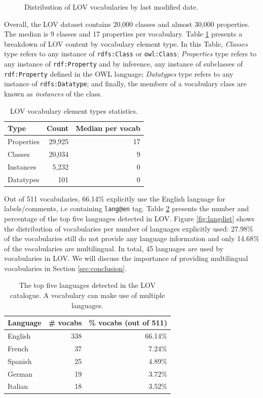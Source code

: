 \documentclass{iosart2c}
\begin{document}
\begin{figure}[htb]
\resizebox{\linewidth}{!}{}
\caption{\label{fig:modifevol} Distribution of LOV vocabularies by last modified date.}
\end{figure}

 
Overall, the LOV dataset contains 20,000 classes and almost 30,000 properties. The median is 9 classes and 17 properties per vocabulary. Table \ref{tab:elements} presents a breakdown of LOV content by vocabulary element type. In this Table, \emph{Classes} type refers to any instance of {\small\texttt{rdfs:Class}} or {\small\texttt{owl:Class}}; \emph{Properties} type refers to any instance of {\small\texttt{rdf:Property}} and by inference, any instance of subclasses of {\small\texttt{rdf:Property}} defined in the OWL language; \emph{Datatypes} type refers to any instance of {\small\texttt{rdfs:Datatype}}; and finally, the members of a vocabulary class are known as \emph{instances} of the class.

\begin{table}[htb]
\caption{LOV vocabulary element types statistics.}
\begin{tabular}{lrr}
\hline
\textbf{Type} & \textbf{Count} &  \textbf{Median per vocab} \\ \hline
Properties & 29,925 & 17 \\
Classes & 20,034 & 9 \\
Instances & 5,232 & 0 \\
Datatypes & 101 & 0 \\
\hline  
\end{tabular}
\label{tab:elements}
\end{table}

Out of 511 vocabularies, 66.14\% explicitly use the English language for labels/comments, i.e containing \texttt{lang@en} tag. Table \ref{tab:language} presents the number and percentage of the top five languages detected in LOV. Figure \ref{fig:langdist} shows the distribution of vocabularies per number of languages explicitly 
used: 27.98\% of the vocabularies still do not provide any language information and only 14.68\% of the vocabularies are multilingual. In total, 45 languages are used by vocabularies in LOV. We will discuss the importance of providing multilingual vocabularies in Section \ref{sec:conclusion}.

 \begin{table}[h!tb]
\caption{The top five languages detected in the LOV catalogue. A vocabulary can make use of multiple languages.}
\begin{tabular}{lrr}
\hline
\textbf{Language} & \textbf{\# vocabs} & \textbf{\% vocabs (out of 511)}  \\ \hline
English & 338 & 66.14\%      \\
French & 37 & 7.24\%      \\
Spanish & 25 & 4.89\%      \\
German & 19 & 3.72\%      \\
Italian & 18 & 3.52\%      \\
\hline  
\end{tabular}
\label{tab:language}
\end{table}
\end{document}
